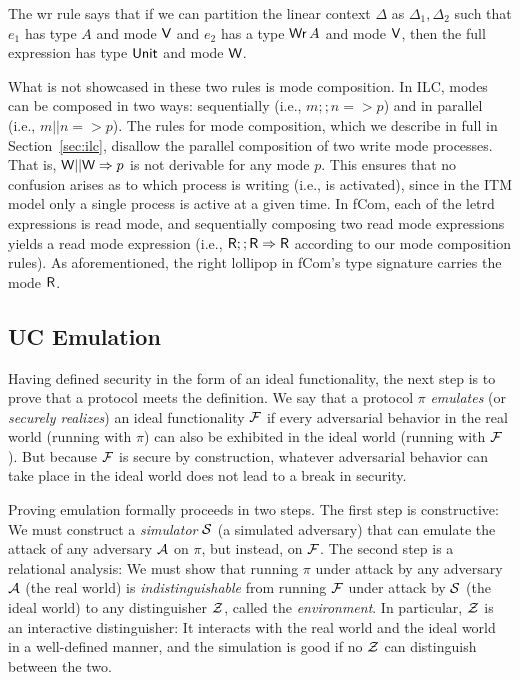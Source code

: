 The wr rule says that if we can partition the linear context $\Delta$ as $\Delta_1, \Delta_2$
such that $e_1$ has type $A$ and mode $\textsf{V}$ and $e_2$ has a type $\text{\textsf{Wr}}\,A$ and
mode $\textsf{V}$, then the full expression has type $\text{\textsf{Unit}}$ and mode $\textsf{W}$.

What is not showcased in these two rules is mode composition. In ILC, modes can
be composed in two ways: sequentially (i.e., $m ;; n => p$) and in parallel
(i.e., $m || n => p$). The rules for mode composition, which we describe in full
in Section~\ref{sec:ilc}, disallow the parallel composition of two write mode
processes. That is, $\textsf{W} || \textsf{W} => p$ is not derivable for any mode $p$. This
ensures that no confusion arises as to which process is writing (i.e., is
activated), since in the ITM model only a single process is active at a given
time. In \textsf{fCom}, each of the letrd expressions is read mode, and
sequentially composing two read mode expressions yields a read mode expression
(i.e., $\textsf{R} ;; \textsf{R} => \textsf{R}$ according to our mode composition rules). As
aforementioned, the right lollipop in \textsf{fCom}'s type signature carries the
mode $\textsf{R}$.

\subsection{UC Emulation}
\label{subsec:emulation}

Having defined security in the form of an ideal functionality, the next step is
to prove that a protocol meets the definition. We say that a protocol $\pi$
\emph{emulates} (or \emph{securely realizes}) an ideal functionality $\mathcal{{F}}$ if
every adversarial behavior in the real world (running with $\pi$) can also be
exhibited in the ideal world (running with $\mathcal{{F}}$). But because $\mathcal{{F}}$ is
secure by construction, whatever adversarial behavior can take place in the
ideal world does not lead to a break in security.

Proving emulation formally proceeds in two steps. The first step is
constructive: We must construct a \emph{simulator} $\mathcal{{S}}$ (a simulated
adversary) that can emulate the attack of any adversary $\mathcal{{A}}$ on $\pi$, but
instead, on $\mathcal{{F}}$. The second step is a relational analysis: We must show
that running $\pi$ under attack by any adversary $\mathcal{{A}}$ (the real world) is
\emph{indistinguishable} from running $\mathcal{{F}}$ under attack by $\mathcal{{S}}$ (the
ideal world) to any distinguisher $\mathcal{{Z}}$, called the \emph{environment}. In
particular, $\mathcal{{Z}}$ is an interactive distinguisher: It interacts with the real
world and the ideal world in a well-defined manner, and the simulation is good
if no $\mathcal{{Z}}$ can distinguish between the two.


